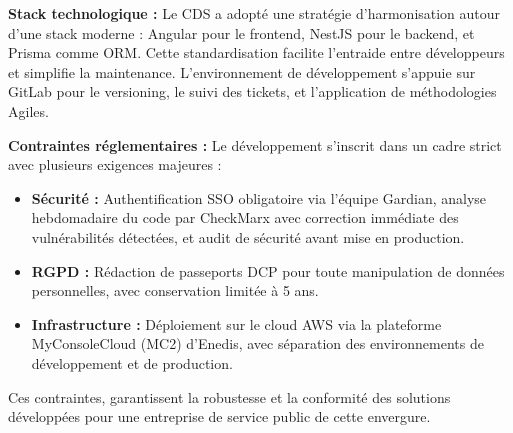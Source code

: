 \textbf{Stack technologique :} Le CDS a adopté une stratégie d'harmonisation autour d'une stack moderne : Angular pour le frontend, NestJS pour le backend, et Prisma comme ORM.
Cette standardisation facilite l'entraide entre développeurs et simplifie la maintenance.
L'environnement de développement s'appuie sur GitLab pour le versioning, le suivi des tickets, et l'application de méthodologies Agiles.

\textbf{Contraintes réglementaires :} Le développement s'inscrit dans un cadre strict avec plusieurs exigences majeures :

\begin{itemize}
    \item \textbf{Sécurité :} Authentification SSO obligatoire via l'équipe Gardian, analyse hebdomadaire du code par CheckMarx avec correction immédiate des vulnérabilités détectées, et audit de sécurité avant mise en production.
    \item \textbf{RGPD :} Rédaction de passeports DCP pour toute manipulation de données personnelles, avec conservation limitée à 5 ans.
    \item \textbf{Infrastructure :} Déploiement sur le cloud AWS via la plateforme MyConsoleCloud (MC2) d'Enedis, avec séparation des environnements de développement et de production.
\end{itemize}

Ces contraintes, garantissent la robustesse et la conformité des solutions développées pour une entreprise de service public de cette envergure.

